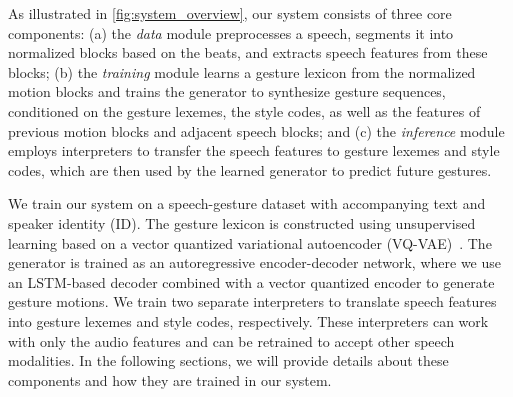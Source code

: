 As illustrated in \fig\ref{fig:system_overview}, our system consists of three core components: (a) the \emph{data} module preprocesses a speech, segments it into normalized blocks based on the beats, and extracts speech features from these blocks; (b) the \emph{training} module learns a gesture lexicon from the normalized motion blocks and trains the generator to synthesize gesture sequences, conditioned on the gesture lexemes, the style codes, as well as the features of previous motion blocks and adjacent speech blocks; and (c) the \emph{inference} module employs interpreters to transfer the speech features to gesture lexemes and style codes, which are then used by the learned generator to predict future gestures.

We train our system on a speech-gesture dataset with accompanying text and speaker identity (ID). The gesture lexicon is constructed using unsupervised learning based on a vector quantized variational autoencoder (VQ-VAE)~\cite{oord2017neural}. The generator is trained as an autoregressive encoder-decoder network, where we use an LSTM-based decoder combined with a vector quantized encoder to generate gesture motions. We train two separate interpreters to translate speech features into gesture lexemes and style codes, respectively. These interpreters can work with only the audio features and can be retrained to accept other speech modalities. In the following sections, we will provide details about these components and how they are trained in our system.
